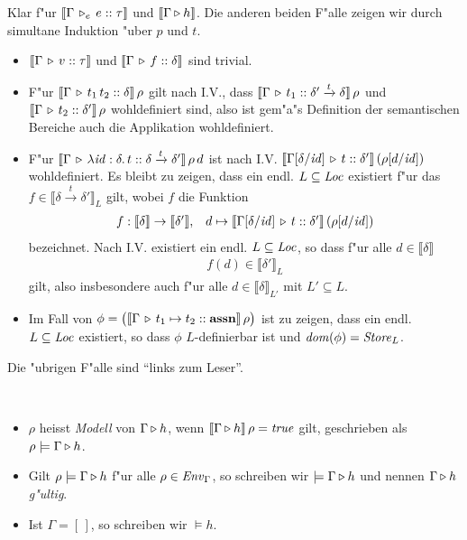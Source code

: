 \documentclass[12pt,a4paper,bigheadings]{scrartcl}
\newcommand{\semantic}[1]{\ensuremath{\llbracket#1\rrbracket}}
\newcommand{\assn}{\ensuremath{\mathbf{assn}}}
\newcommand{\tto}{\ensuremath{\xrightarrow{t}}}
\newcommand{\Tje}[3]{#1 \,\tr_e\, #2\cc#3}
\begin{document}
\begin{beweis}
  Klar f"ur $\semantic{\Tje{\Gamma}{e}{\tau}}$ und $\semantic{\Tjh{\Gamma}{h}}$. Die anderen beiden
  F"alle zeigen wir durch simultane Induktion "uber $p$ und $t$.
  \begin{itemize}
    \item $\semantic{\Tj{\Gamma}{v}{\tau}}$ und $\semantic{\Tj{\Gamma}{f}{\delta}}$ sind trivial.

    \item F"ur $\semantic{\Tj{\Gamma}{\app{t_1}{t_2}}{\delta}}\,\rho$ gilt nach I.V., dass
          $\semantic{\Tj{\Gamma}{t_1}{\delta'\tto\delta}}\,\rho$ und
          $\semantic{\Tj{\Gamma}{t_2}{\delta'}}\,\rho$ wohldefiniert sind, also ist gem"a"s
          Definition der semantischen Bereiche auch die Applikation wohldefiniert.

    \item F"ur $\semantic{\Tj{\Gamma}{\abstr{\id:\delta}{t}}{\delta\tto\delta'}}\,\rho\,d$ ist nach I.V.
          $\semantic{\Tj{\Gamma[\delta/\id]}{t}{\delta'}}\,(\rho[d/\id])$ wohldefiniert. Es bleibt zu
          zeigen, dass ein endl. $L\subseteq{\text{\it Loc\/}}$ existiert f"ur das $f\in\semantic{\delta\tto\delta'}_L$ gilt,
          wobei $f$ die Funktion
          \[\begin{array}{rl}
            f: \semantic{\delta} \to \semantic{\delta'}, & d \mapsto
            \semantic{\Tj{\Gamma[\delta/\id]}{t}{\delta'}}\,(\rho[d/\id])
          \end{array}\]
          bezeichnet. Nach I.V. existiert ein endl. $L\subseteq{\text{\it Loc\/}}$, so dass f"ur alle $d\in\semantic{\delta}$
          \[\begin{array}{c}
            f(d) \in \semantic{\delta'}_L
          \end{array}\]
          gilt, also insbesondere auch f"ur alle $d\in\semantic{\delta}_{L'}$ mit $L'\subseteq L$.

    \item Im Fall von $\phi = \bigl(\semantic{\Tj{\Gamma}{t_1\mapsto t_2}{\assn}}\,\rho\bigr)$ ist zu zeigen,
          dass ein endl. $L\subseteq{\text{\it Loc\/}}$ existiert, so dass $\phi$ $L$-definierbar ist und ${\text{\it dom\/}}(\phi)={\text{\it Store\/}}_L$.
  \end{itemize}
  Die "ubrigen F"alle sind "`links zum Leser"'.
\end{beweis}

\begin{definition}[Modell] \
  \begin{itemize}
    \item $\rho$ heisst {\em Modell} von $\Gamma \triangleright h$, wenn $\semantic{\Tjh{\Gamma}{h}}\,\rho = \true$
          gilt, geschrieben als $\rho \models \Gamma \triangleright h$.
    \item Gilt $\rho \models \Gamma \triangleright h$ f"ur alle $\rho\in{\text{\it Env\/}}_\Gamma$, so schreiben wir
          $\models \Gamma \triangleright h$ und nennen  $\Gamma \triangleright h$ {\em g"ultig}.
    \item Ist $\Gamma = [\,]$, so schreiben wir $\models h$.
  \end{itemize}
\end{definition}
\end{document}
